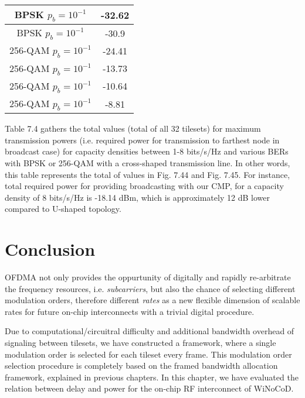 \begin{table}[]
\begin{tabular}{|c|c|}
BPSK $p_{b}=10^{-1}$     & -32.62                                                                                                    \\ \hline
BPSK $p_{b}=10^{-1}$   & -30.9                                                                                                     \\ \hline
256-QAM $p_{b}=10^{-1}$  & -24.41                                                                                                    \\ \hline
256-QAM $p_{b}=10^{-1}$  & -13.73                                                                                                    \\ \hline
256-QAM $p_{b}=10^{-1}$  & -10.64                                                                                                    \\ \hline
256-QAM $p_{b}=10^{-1}$  & -8.81                                                                                                     \\ \hline
\end{tabular}
\end{table}

Table 7.4 gathers the total values (total of all 32 tilesets) for maximum transmission powers (i.e. required power for transmission to farthest node in broadcast case) for capacity densities between 1-8 bits/s/Hz and various BERs with BPSK or 256-QAM with a cross-shaped transmission line. In other words, this table represents the total of values in Fig. 7.44 and Fig. 7.45. For instance, total required power for providing broadcasting with our CMP, for a capacity density of 8 bits/s/Hz is -18.14 dBm, which is approximately 12 dB lower compared to U-shaped topology.
\section{Conclusion}

OFDMA not only provides the oppurtunity of digitally and rapidly re-arbitrate the frequency resources, i.e. \textit{subcarriers}, but also the chance of selecting different modulation orders, therefore different \textit{rates} as a new flexible dimension of scalable rates for future on-chip interconnects with a trivial digital procedure.

Due to computational/circuitral difficulty and additional bandwidth overhead of signaling between tilesets, we have constructed a framework, where a single modulation order is selected for each tileset every frame. This modulation order selection procedure is completely based on the framed bandwidth allocation framework, explained in previous chapters. In this chapter, we have evaluated the relation between delay and power for the on-chip RF interconnect of WiNoCoD. 


